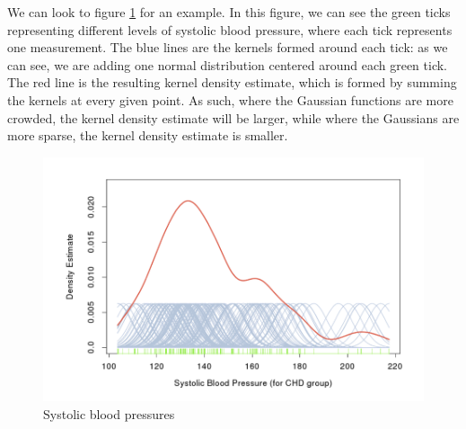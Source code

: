 \documentclass[a4paper]{article}
\begin{document}
We can look to figure \ref{fig:systolic} for an example. In this figure, we can see the green ticks representing different levels of systolic blood pressure, where each tick represents one measurement. The blue lines are the kernels formed around each tick: as we can see, we are adding one normal distribution centered around each green tick. The red line is the resulting kernel density estimate, which is formed by summing the kernels at every given point. As such, where the Gaussian functions are more crowded, the kernel density estimate will be larger, while where the Gaussians are more sparse, the kernel density estimate is smaller. 
\begin{figure}
\centering
\includegraphics[width=1.0\textwidth]{systolic.png}
\caption{\label{fig:systolic}Systolic blood pressures}
\end{figure}
\end{document}
